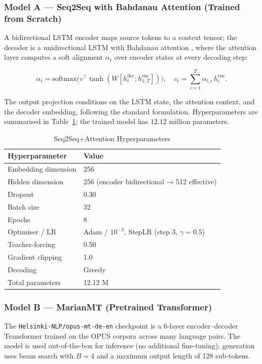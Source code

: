 \subsubsection{Model A — Seq2Seq with Bahdanau Attention (Trained from Scratch)}

A bidirectional LSTM encoder maps source tokens to a context tensor; the
decoder is a unidirectional LSTM with Bahdanau attention
\cite{bahdanau2015neural}, where the attention layer computes a soft
alignment $\alpha_t$ over encoder states at every decoding step:

\[
\alpha_t = \mathrm{softmax}\bigl(v^{\top}\tanh(W[h_t^{\text{dec}};h_{1:T}^{\text{enc}}])\bigr),
\quad
c_t = \sum_{i=1}^{T}\alpha_{t,i}\, h_i^{\text{enc}}.
\]

The output projection conditions on the LSTM state, the attention
context, and the decoder embedding, following the standard formulation.
Hyperparameters are summarised in Table~\ref{tab:s2s_hp}; the trained
model has $12.12$ million parameters.

\begin{table}[h]
\centering
\caption{Seq2Seq+Attention Hyperparameters}
\label{tab:s2s_hp}
\begin{tabular}{ll}
\toprule
Hyperparameter      & Value \\
\midrule
Embedding dimension & 256 \\
Hidden dimension    & 256 (encoder bidirectional → 512 effective) \\
Dropout             & 0.30 \\
Batch size          & 32 \\
Epochs              & 8 \\
Optimiser / LR      & Adam / $10^{-3}$, StepLR (step 3, $\gamma=0.5$) \\
Teacher-forcing     & 0.50 \\
Gradient clipping   & 1.0 \\
Decoding            & Greedy \\
Total parameters    & 12.12 M \\
\bottomrule
\end{tabular}
\end{table}

\subsubsection{Model B — MarianMT (Pretrained Transformer)}

The \texttt{Helsinki-NLP/opus-mt-de-en} checkpoint
\cite{tiedemann2020opusmt} is a 6-layer encoder–decoder Transformer
trained on the OPUS corpora across many language pairs. The model is
used out-of-the-box for inference (no additional fine-tuning); generation
uses beam search with $B=4$ and a maximum output length of 128
sub-tokens.

